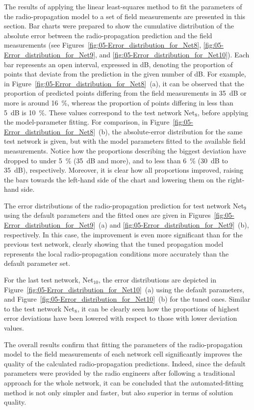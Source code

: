 The results of applying the linear least-squares method to fit the
parameters of the radio-propagation model to a set of field measurements
are presented in this section. Bar charts were prepared to show the
cumulative distribution of the absolute error between the radio-propagation
prediction and the field measurements (see Figures~\ref{fig:05-Error_distribution_for_Net8},
\ref{fig:05-Error_distribution_for_Net9}, and \ref{fig:05-Error_distribution_for_Net10}).
Each bar represents an open interval, expressed in dB, denoting the
proportion of points that deviate from the prediction in the given
number of dB. For example, in Figure~\ref{fig:05-Error_distribution_for_Net8}~(a),
it can be observed that the proportion of predicted points differing
from the field measurements in 35~dB or more is around 16~\%, whereas
the proportion of points differing in less than 5~dB is 10~\%. These
values correspond to the test network Net$_{8}$, before applying
the model-parameter fitting. For comparison, in Figure~\ref{fig:05-Error_distribution_for_Net8}~(b),
the absolute-error distribution for the same test network is given,
but with the model parameters fitted to the available field measurements.
Notice how the proportions describing the biggest deviation have dropped
to under 5~\% (35~dB and more), and to less than 6~\% (30~dB to
35~dB), respectively. Moreover, it is clear how all proportions improved,
raising the bars towards the left-hand side of the chart and lowering
them on the right-hand side.

The error distributions of the radio-propagation prediction for test
network Net$_{9}$ using the default parameters and the fitted ones
are given in Figures~\ref{fig:05-Error_distribution_for_Net9}~(a)
and \ref{fig:05-Error_distribution_for_Net9}~(b), respectively.
In this case, the improvement is even more significant than for the
previous test network, clearly showing that the tuned propagation
model represents the local radio-propagation conditions more accurately
than the default parameter set.

For the last test network, Net$_{10}$, the error distributions are
depicted in Figure~\ref{fig:05-Error_distribution_for_Net10}~(a)
using the default parameters, and Figure~\ref{fig:05-Error_distribution_for_Net10}~(b)
for the tuned ones. Similar to the test network Net$_{8}$, it can
be clearly seen how the proportions of highest error deviations have
been lowered with respect to those with lower deviation values. 

The overall results confirm that fitting the parameters of the radio-propagation
model to the field measurements of each network cell significantly
improves the quality of the calculated radio-propagation predictions.
Indeed, since the default parameters were provided by the radio engineers
after following a traditional approach for the whole network, it can
be concluded that the automated-fitting method is not only simpler
and faster, but also superior in terms of solution quality.

